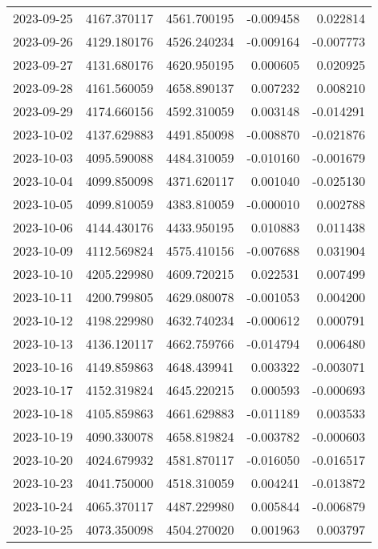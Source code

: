 \begin{tabular}{lrrrr}
2023-09-25 & 4167.370117 & 4561.700195 &       -0.009458 &     0.022814 \\
2023-09-26 & 4129.180176 & 4526.240234 &       -0.009164 &    -0.007773 \\
2023-09-27 & 4131.680176 & 4620.950195 &        0.000605 &     0.020925 \\
2023-09-28 & 4161.560059 & 4658.890137 &        0.007232 &     0.008210 \\
2023-09-29 & 4174.660156 & 4592.310059 &        0.003148 &    -0.014291 \\
2023-10-02 & 4137.629883 & 4491.850098 &       -0.008870 &    -0.021876 \\
2023-10-03 & 4095.590088 & 4484.310059 &       -0.010160 &    -0.001679 \\
2023-10-04 & 4099.850098 & 4371.620117 &        0.001040 &    -0.025130 \\
2023-10-05 & 4099.810059 & 4383.810059 &       -0.000010 &     0.002788 \\
2023-10-06 & 4144.430176 & 4433.950195 &        0.010883 &     0.011438 \\
2023-10-09 & 4112.569824 & 4575.410156 &       -0.007688 &     0.031904 \\
2023-10-10 & 4205.229980 & 4609.720215 &        0.022531 &     0.007499 \\
2023-10-11 & 4200.799805 & 4629.080078 &       -0.001053 &     0.004200 \\
2023-10-12 & 4198.229980 & 4632.740234 &       -0.000612 &     0.000791 \\
2023-10-13 & 4136.120117 & 4662.759766 &       -0.014794 &     0.006480 \\
2023-10-16 & 4149.859863 & 4648.439941 &        0.003322 &    -0.003071 \\
2023-10-17 & 4152.319824 & 4645.220215 &        0.000593 &    -0.000693 \\
2023-10-18 & 4105.859863 & 4661.629883 &       -0.011189 &     0.003533 \\
2023-10-19 & 4090.330078 & 4658.819824 &       -0.003782 &    -0.000603 \\
2023-10-20 & 4024.679932 & 4581.870117 &       -0.016050 &    -0.016517 \\
2023-10-23 & 4041.750000 & 4518.310059 &        0.004241 &    -0.013872 \\
2023-10-24 & 4065.370117 & 4487.229980 &        0.005844 &    -0.006879 \\
2023-10-25 & 4073.350098 & 4504.270020 &        0.001963 &     0.003797 \\

\end{tabular}
